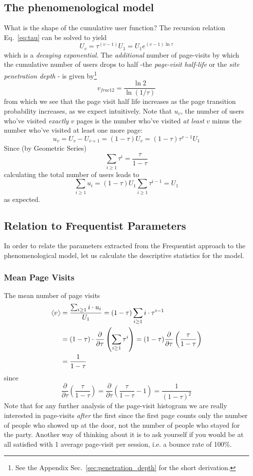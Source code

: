 \documentclass[12pt]{report}
\newcommand{\beq}{\begin{equation}} %
\newcommand{\eeq}{\end{equation}} %
\newcommand{\bdm}{\begin{displaymath}} %
\newcommand{\edm}{\end{displaymath}} %
\newcommand{\firstpartial}[1]{\frac{\partial}{\partial #1}}
\newcommand{\sumge}[2]{\sum_{#1\ge #2}}
\newcommand{\langl}{\begin{picture}(4.5,7)
\put(1.1,2.5){\rotatebox{60}{\line(1,0){5.5}}}
\put(1.1,2.5){\rotatebox{300}{\line(1,0){5.5}}}
\end{picture}}
\newcommand{\rangl}{\begin{picture}(4.5,7)
\put(.9,2.5){\rotatebox{120}{\line(1,0){5.5}}}
\put(.9,2.5){\rotatebox{240}{\line(1,0){5.5}}}
\end{picture}}
\newcommand{\mymean}[1]{\ensuremath{\langl{#1}\rangl}} %
\begin{document}
\subsection{The phenomenological model}
What is the shape of the cumulative user function? The recursion
relation Eq.~\ref{eq:tau} can be solved to yield
\beq\label{eq:cum_users_fn}
U_v = \tau^{(v-1)} U_1 = U_1 e^{(v-1)\ln\tau}
\eeq
which is a {\em decaying exponential}. The {\em additional} number of
page-visits by which the cumulative number of users drops to half -the
{\em page-visit half-life} or the {\em site penetration depth} - is given by\footnote{See the
Appendix Sec.~\ref{sec:penetration_depth} for the short derivation.}
\bdm
v_{frac12} = \frac{\ln 2}{\ln(1/\tau)}
\edm
from which we see that the page visit half life increases as the page
transition probability increases, as we expect intuitively.
Note that \(u_v\), the number of users who've visited {\em exactly}
\(v\) pages is the number who've visited {\em at least} \(v\) minus
the number who've visited at least one more page:
\bdm
u_v = U_v - U_{v+1}=(1-\tau)U_v=(1-\tau)\tau^{v-1}U_1
\edm
Since (by Geometric Series)
\bdm
\sumge{i}{1}\tau^i = \frac{\tau}{1-\tau}
\edm
calculating the total number of users leads to
\bdm
\sumge{i}{1} u_i = (1-\tau)U_1\sumge{i}{1} \tau^{i-1} = U_1
\edm
as expected.

\subsection{Relation to Frequentist Parameters}
In order to relate the parameters extracted from the Frequentist approach to
the phenomenological model, let us calculate the descriptive statistics for
the model.

\subsubsection{Mean Page Visits}
The mean number of page visits
\beq
\begin{split}
  \mymean{v} &= \frac{\sumge{i}{1}i\cdot u_i}{U_1}=(1-\tau)\sumge{i}{1}i\cdot \tau^{i-1} \\
  &=(1-\tau)\cdot\firstpartial{\tau}\left(\sumge{i}{1}\tau^i \right)= (1-\tau)\firstpartial{\tau}\left(\frac{\tau}{1-\tau}\right) \\
  &= \frac{1}{1-\tau}
\end{split}
\eeq
since
\bdm
\firstpartial{\tau}\left(\frac{\tau}{1-\tau}\right) = \firstpartial{\tau}\left(\frac{\tau}{1-\tau} - 1\right) = \frac{1}{(1-\tau)^2}
\edm
Note that for any further analysis of the page-visit histogram we are
really interested in page-visits {\em after} the first since the first
page counts only the number of people who showed up at the door, not
the number of people who stayed for the party. Another way of thinking
about it is to ask yourself if you would be at all satisfied with 1
average page-visit per session, i.e. a bounce rate of 100\%.
\end{document}
